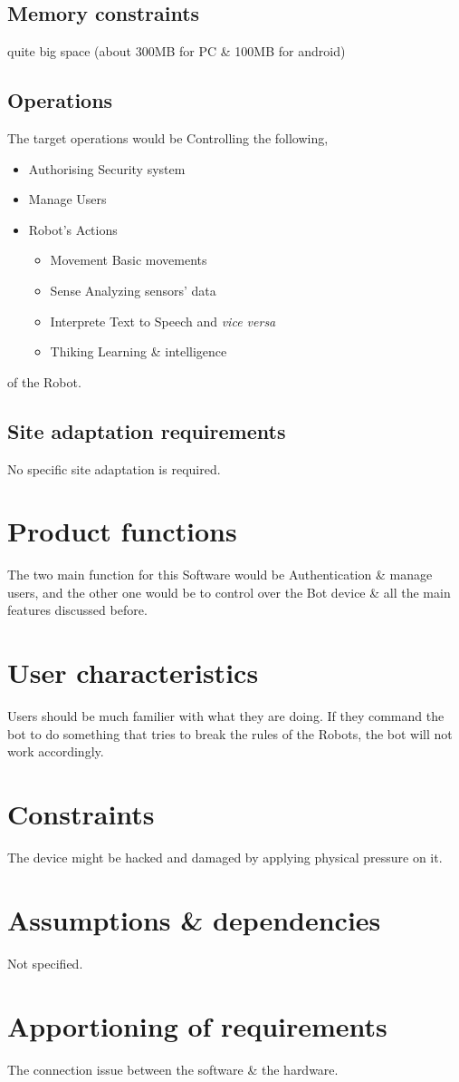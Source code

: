 \subsection{Memory constraints} quite big space (about 300MB for PC \& 100MB for android)
\subsection{Operations} The target operations would be Controlling the following,
	\begin{itemize}
		\item{Authorising} Security system
		\item{Manage}	Users
		\item{Robot's Actions}
		\begin{itemize}
			\item{Movement} Basic movements
			\item{Sense} Analyzing sensors' data
			\item{Interprete} Text to Speech and \textit{vice versa}
			\item{Thiking} Learning \& intelligence
		\end{itemize}
	\end{itemize}
	of the Robot.
\subsection{Site adaptation requirements}
No specific site adaptation is required.
\section{Product functions}
The two main function for this Software would be Authentication \& manage users, and the other one would be to control over the Bot device \& all the main features discussed before.
\section{User characteristics}
Users should be much familier with what they are doing. If they command the bot to do something that tries to break the rules of the Robots, the bot will not work accordingly.
\section{Constraints}
The device might be hacked and damaged by applying physical pressure on it.
\section{Assumptions \& dependencies}
Not specified.
\section{Apportioning of requirements}
The connection issue between the software \& the hardware.
